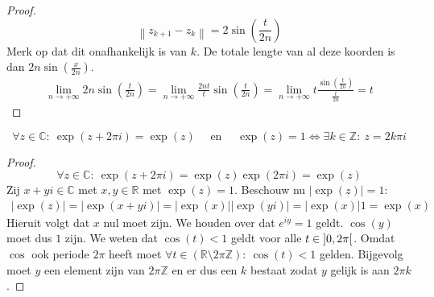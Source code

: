 \documentclass[main.tex]{subfiles}
\begin{document}
\begin{bpr}
\begin{proof}
    \[ \left\|z_{k+1}-z_{k}\right\| = 2\sin\left(\frac{t}{2n}\right) \]
    Merk op dat dit onafhankelijk is van $k$.
    De totale lengte van al deze koorden is dan $2n\sin\left(\frac{x}{2n}\right)$.
    \begin{align*}
      \lim_{n\rightarrow +\infty}2n\sin\left(\frac{t}{2n}\right)
      = \lim_{n\rightarrow +\infty}\frac{2nt}{t}\sin\left(\frac{t}{2n}\right)
      = \lim_{n\rightarrow +\infty}t\frac{\sin\left(\frac{t}{2n}\right)}{\frac{t}{2n}}
      = t
    \end{align*}
  \end{proof}
\end{bpr}

\begin{bpr}
  \[ \forall z\in \mathbb{C}:\ \exp(z+2\pi i) = \exp(z) \quad\text{ en }\quad \exp(z) = 1 \Leftrightarrow \exists k\in \mathbb{Z}:\ z = 2k\pi i \]

  \begin{proof}
    \[ \forall z \in \mathbb{C}:\ \exp(z + 2\pi i) = \exp(z)\exp(2\pi i) = \exp(z) \]
    Zij $x+yi \in \mathbb{C}$ met $x,y \in \mathbb{R}$ met $\exp(z)=1$.
    Beschouw nu $|\exp(z)| = 1$:
    \begin{align*}
      \left|\exp(z)\right|
      = \left|\exp(x+yi)\right|
      = \left|\exp(x)\right|\left|\exp(yi)\right|
      = \left|\exp(x)\right|1
      = \exp(x)
    \end{align*}
    Hieruit volgt dat $x$ nul moet zijn.\waarom
    We houden over dat $e^{iy}=1$ geldt.
    $\cos(y)$ moet dus $1$ zijn.
    We weten dat $\cos(t) < 1$ geldt voor alle $t\in \interval[open]{0}{2\pi}$.
    Omdat $\cos$ ook periode $2\pi$ heeft moet $\forall t\in (\mathbb{R} \setminus 2\pi\mathbb{Z}):\ \cos(t) < 1$ gelden.
    Bijgevolg moet $y$ een element zijn van $2\pi \mathbb{Z}$ en er dus een $k$ bestaat zodat $y$ gelijk is aan $2\pi k$.
  \end{proof}
\end{bpr}
\end{document}

